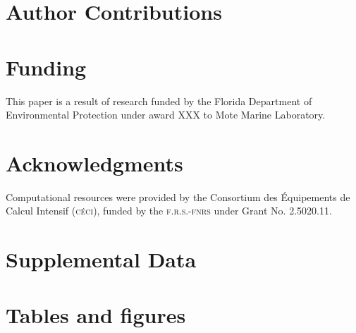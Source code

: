 \documentclass[utf8]{frontiersSCNS}
\begin{document}
\section*{Author Contributions}
  
\section*{Funding}
This paper is a result of research funded by the Florida Department of Environmental Protection under award XXX to Mote Marine Laboratory. 

\section*{Acknowledgments}
Computational resources were provided by the Consortium des \'Equipements de Calcul Intensif (\textsc{c\'eci}), funded by the \textsc{f.r.s.-fnrs} under Grant No. 2.5020.11.

\section*{Supplemental Data}

 



\section*{Tables and figures}
\end{document}
